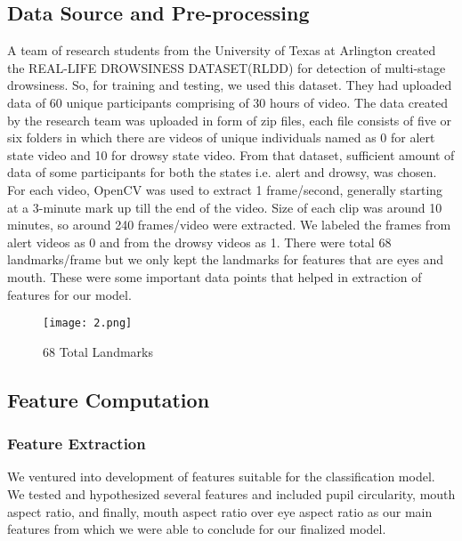 \documentclass{article}
\begin{document}
\subsection{Data Source and Pre-processing}
A team of research students from the University of Texas at Arlington created the REAL-LIFE DROWSINESS DATASET(RLDD) for detection of multi-stage drowsiness. So, for training and testing, we used this dataset. They had uploaded data of 60 unique participants comprising of 30 hours of video. The data created by the research team was uploaded in form of zip files, each file consists of five or six folders in which there are videos of unique individuals named as 0 for alert state video and 10 for drowsy state video. From that dataset, sufficient amount of data of some participants for both the states i.e. alert and drowsy, was chosen. For each video, OpenCV was used to extract 1 frame/second, generally starting at a 3-minute mark up till the end of the video. Size of each clip was around 10 minutes, so around 240 frames/video were extracted. We labeled the frames from alert videos as 0 and from the drowsy videos as 1. There were total 68 landmarks/frame but we only kept the landmarks for features that are eyes and mouth. These were some important data points that helped in extraction of features for our model.

\begin{figure}[H]
\centering
\texttt{[image: 2.png]}
\caption {68 Total Landmarks}
\label{fig-name}
\end{figure}




\subsection{Feature Computation}
\subsubsection{Feature Extraction}
We ventured into development of features suitable for the classification model. We tested and hypothesized several features and included pupil circularity, mouth aspect ratio, and finally, mouth aspect ratio over eye aspect ratio as our main features from which we were able to conclude for our finalized model.
\end{document}
